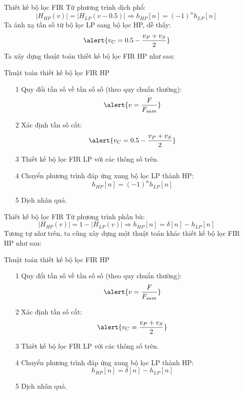 \documentclass[8pt]{beamer}
\begin{document}
\begin{frame}{Thiết kế bộ lọc FIR}
	Từ phương trình dịch phổ:
	$$|H_{HP}(v)|=|H_{LP}(v-0.5)|\Rightarrow h_{HP}[n]=(-1)^{n}h_{LP}[n]$$
	Ta ánh xạ tần số từ bộ lọc LP sang bộ lọc HP, dễ thấy: $$\alert{v_{C}=0.5-\frac{v_{P}+v_{S}}{2}}$$
	Ta xây dựng thuật toán thiết kế bộ lọc FIR HP như sau:
	\begin{block}{Thuật toán thiết kế bộ lọc FIR HP}
		\begin{enumerate}
			\item[1] Quy đổi tần số về tần số số (theo quy chuẩn thường):
				$$\alert{v=\frac{F}{F_{sam}}}$$
			\item[2] Xác định tần số cắt:
				$$\alert{v_{C}=0.5-\frac{v_{P}+v_{S}}{2}}$$
			\item[3] Thiết kế bộ lọc FIR LP với các thông số trên.
			\item[4] Chuyển phương trình đáp ứng xung bộ lọc LP thành HP:
				$$h_{HP}[n]=(-1)^{n}h_{LP}[n] $$
			\item[5] Dịch nhân quả.
		\end{enumerate}
	\end{block}
\end{frame}
\begin{frame}{Thiết kế bộ lọc FIR}
	Từ phương trình phần bù:
	$$|H_{HP}(v)|=1-|H_{LP}(v)|\Rightarrow h_{HP}[n]=\delta[n]-h_{LP}[n]$$
	Tương tự như trên, ta cũng xây dựng một thuật toán khác thiết kế bộ lọc FIR HP như sau:
	\begin{block}{Thuật toán thiết kế bộ lọc FIR HP}
		\begin{enumerate}
			\item[1] Quy đổi tần số về tần số số (theo quy chuẩn thường):
				$$\alert{v=\frac{F}{F_{sam}}}$$
			\item[2] Xác định tần số cắt:
				$$\alert{v_{C}=\frac{v_{P}+v_{S}}{2}}$$
			\item[3] Thiết kế bộ lọc FIR LP với các thông số trên.
			\item[4] Chuyển phương trình đáp ứng xung bộ lọc LP thành HP:
				$$h_{HP}[n]=\delta[n]-h_{LP}[n] $$
			\item[5] Dịch nhân quả.
		\end{enumerate}
	\end{block}
\end{frame}
\end{document}
